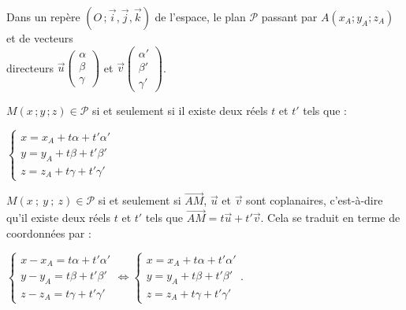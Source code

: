 \documentclass{cornouaille}
\begin{document}
\begin{propriete}
  Dans un  repère $(O\,;\vec{i},\vec{j},\vec{k})$  de l'espace, le plan
  $\mathcal{P}$ passant par $A(x_A;y_A;z_A)$ et de vecteurs\\ directeurs
  $\vec{u} \begin {pmatrix} \alpha\\\beta\\\gamma \end{pmatrix}$ et
  $\vec{v} \begin {pmatrix} \alpha'\\\beta'\\\gamma' \end{pmatrix}$. 

  $M(x\,;y\,;z)\in \mathcal{P}$ si et seulement si il existe deux réels
  $t$ et $t'$ tels que :
  \begin{center}
    $\begin{cases}
      x=x_A+t\alpha+t'\alpha' \\
      y=y_A+t\beta +t'\beta'  \\
      z=z_A+t\gamma +t'\gamma' 
    \end{cases}$
  \end{center}
\end{propriete}

\begin{preuve}
  $M(x\ ;\ y\ ;\ z)\in \mathcal{P}$ si et seulement si
  $\overrightarrow{AM}$, $\vec{u}$ et $\vec{v}$ sont coplanaires,
  c'est-à-dire qu'il existe deux réels $t$ et $t'$ tels que
  $\overrightarrow{AM}=t\overrightarrow{u}+t'\overrightarrow{v}$.
  Cela se traduit en terme de coordonnées par :
\begin{center}
  $\begin{cases}x-x_A=t\alpha+t'\alpha' \\
    y-y_A=t\beta +t'\beta' \\
    z-z_A=t\gamma + t'\gamma'
  \end{cases}
  \Leftrightarrow
  \begin{cases}
    x=x_A+t\alpha+t'\alpha' \\
    y=y_A+t\beta +t'\beta' \\
    z=z_A+t\gamma +t'\gamma' 
  \end{cases}$.
\end{center}
\end{preuve}
\end{document}
